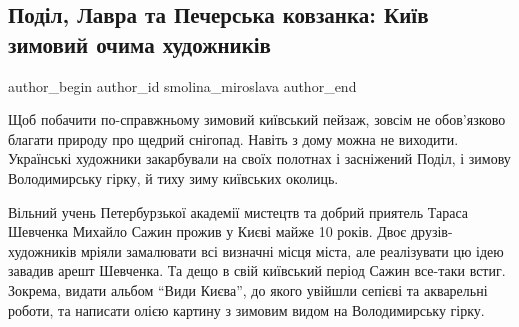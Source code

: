 
 
 
 
 
 
\subsection{Поділ, Лавра та Печерська ковзанка: Київ зимовий очима художників}
\label{sec:13_01_2022.stz.kiev.bigkyiv.1.kiev_zima_hudozhniki}
 
\ifcmt
 author_begin
   author_id smolina_miroslava
 author_end
\fi

Щоб побачити по-справжньому зимовий київський пейзаж, зовсім не обов’язково
благати природу про щедрий снігопад. Навіть з дому можна не виходити.
Українські художники закарбували на своїх полотнах і засніжений Поділ, і зимову
Володимирську гірку, й тиху зиму київських околиць.


Вільний учень Петербурзької академії мистецтв та добрий приятель Тараса
Шевченка Михайло Сажин прожив у Києві майже 10 років. Двоє друзів-художників
мріяли замалювати всі визначні місця міста, але реалізувати цю ідею завадив
арешт Шевченка. Та дещо в свій київський період Сажин все-таки встиг. Зокрема,
видати альбом \enquote{Види Києва}, до якого увійшли сепієві та акварельні
роботи, та написати олією картину з зимовим видом на Володимирську гірку.
